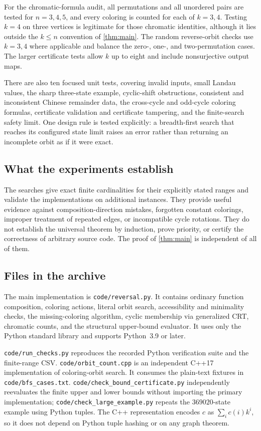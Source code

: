 \documentclass[11pt,a4paper]{article}
\numberwithin{equation}{section}
\theoremstyle{definition}
\theoremstyle{remark}
\begin{document}
For the chromatic-formula audit, all permutations and all unordered pairs are
tested for $n=3,4,5$, and every coloring is counted for each of $k=3,4$.
Testing $k=4$ on three vertices is legitimate for those chromatic
identities, although it lies outside the $k\le n$ convention of
\cref{thm:main}. The random reverse-orbit checks use $k=3,4$ where applicable
and balance the zero-, one-, and two-permutation cases. The larger
certificate tests allow $k$ up to eight and include nonsurjective output
maps.

There are also ten focused unit tests, covering invalid inputs, small Landau
values, the sharp three-state example, cyclic-shift obstructions, consistent
and inconsistent Chinese remainder data, the cross-cycle and odd-cycle
coloring formulas, certificate validation and certificate tampering, and the
finite-search safety limit. One design rule is tested explicitly: a
breadth-first search that reaches its configured state limit raises an error
rather than returning an incomplete orbit as if it were exact.

\subsection{What the experiments establish}

The searches give exact finite cardinalities for their explicitly stated
ranges and validate the implementations on additional instances. They provide
useful evidence against composition-direction mistakes, forgotten constant
colorings, improper treatment of repeated edges, or incompatible cycle
rotations. They do not establish the universal theorem by induction, prove
priority, or certify the correctness of arbitrary source code. The proof of
\cref{thm:main} is independent of all of them.

\subsection{Files in the archive}

The main implementation is \texttt{code/reversal.py}. It contains ordinary
function composition, coloring actions, literal orbit search, accessibility
and minimality checks, the missing-coloring algorithm, cyclic membership via
generalized CRT, chromatic counts, and the structural upper-bound evaluator.
It uses only the Python standard library and supports Python~3.9 or later.

\texttt{code/run\_checks.py} reproduces the recorded Python verification
suite and the finite-range CSV. \texttt{code/orbit\_count.cpp} is an
independent C++17 implementation of coloring-orbit search. It consumes the
plain-text fixtures in \texttt{code/bfs\_cases.txt}.
\texttt{code/check\_bound\_certificate.py} independently reevaluates the
finite upper and lower bounds without importing the primary implementation;
\texttt{code/check\_large\_example.py} repeats the $369020$-state example
using Python tuples. The C++ representation
encodes $c$ as $\sum_i c(i)k^i$, so it does not depend on Python tuple hashing
or on any graph theorem.
\end{document}
